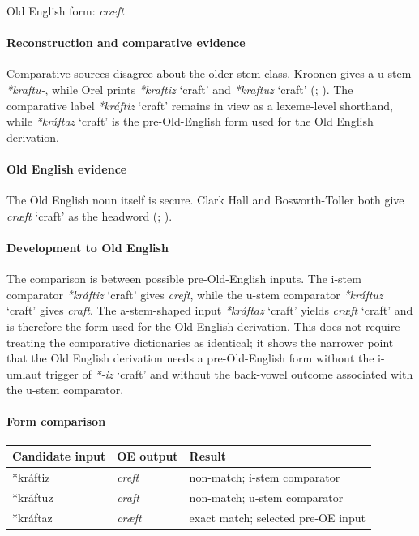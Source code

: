 \documentclass[
  british,
  a4paper,
]{article}
\newcounter{none} %
\providecommand{\Recon}[1]{\emph{*#1}}
\begin{document}
Old English form: \emph{cræft}

\paragraph{Reconstruction and comparative
evidence}\label{reconstruction-and-comparative-evidence-93}

Comparative sources disagree about the older stem class. Kroonen gives a
u-stem \emph{*kraftu-}, while Orel prints \Recon{kraftiz} `craft' and
\Recon{kraftuz} `craft' (;
). The comparative label
\Recon{kráftiz} `craft' remains in view as a lexeme-level shorthand,
while \Recon{kráftaz} `craft' is the pre-Old-English form used for the
Old English derivation.

\paragraph{Old English evidence}\label{old-english-evidence-95}

The Old English noun itself is secure. Clark Hall and Bosworth-Toller
both give \emph{cræft} `craft' as the headword
(;
).

\paragraph{Development to Old
English}\label{development-to-old-english-93}

The comparison is between possible pre-Old-English inputs. The i-stem
comparator \Recon{kráftiz} `craft' gives \emph{creft}, while the u-stem
comparator \Recon{kráftuz} `craft' gives \emph{craft}. The a-stem-shaped
input \Recon{kráftaz} `craft' yields \emph{cræft} `craft' and is
therefore the form used for the Old English derivation. This does not
require treating the comparative dictionaries as identical; it shows the
narrower point that the Old English derivation needs a pre-Old-English
form without the i-umlaut trigger of \Recon{-iz} `craft' and without the
back-vowel outcome associated with the u-stem comparator.

\paragraph{Form comparison}\label{form-comparison-4}

{\def\LTcaptype{none} %
\begin{longtable}[]{@{}lll@{}}
\toprule\noalign{}
Candidate input & OE output & Result \\
\midrule\noalign{}
\endhead
\bottomrule\noalign{}
\endlastfoot
*kráftiz & \emph{creft} & non-match; i-stem comparator \\
*kráftuz & \emph{craft} & non-match; u-stem comparator \\
*kráftaz & \emph{cræft} & exact match; selected pre-OE input \\
\end{longtable}
}
\end{document}
